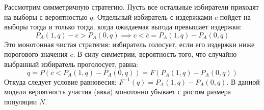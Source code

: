 Рассмотрим симметричную стратегию. Пусть все остальные избиратели приходят на выборы с вероятностью $q$. Отдельный избиратель с издержками $c$ пойдет на выборы тогда и только тогда, когда ожидаемая выгода превышает издержки:
\begin{equation}
P_A(1, q) - c > P_A(0, q) \implies c < \bar{c} = P_A(1, q) - P_A(0, q)
\end{equation}
Это монотонная чистая стратегия: избиратель голосует, если его издержки ниже порогового значения $\bar{c}$. В силу симметрии, вероятность того, что случайно выбранный избиратель проголосует, равна:
\begin{equation}
q = P(c < P_A(1, q) - P_A(0, q)) = F(P_A(1, q) - P_A(0, q))
\end{equation}
Откуда следует условие равновесия: $F^{-1}(q) = P_A(1, q) - P_A(0, q)$. В данной модели вероятность участия (явка) монотонно убывает с ростом размера популяции $N$.

